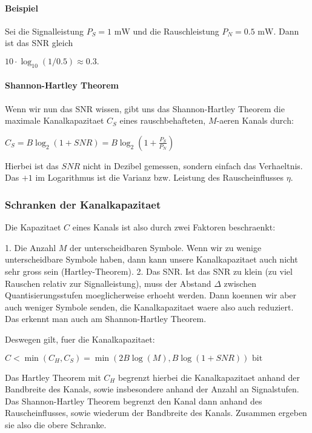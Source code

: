 \paragraph{ Beispiel}

Sei die Signalleistung $P_S = 1 \text{ mW}$ und die Rauschleistung $P_N = 0.5
\text{ mW}$. Dann ist das SNR gleich

$10 \cdot \log_{10}(1/0.5) \approx 0.3 .$

\paragraph{ Shannon-Hartley Theorem}

Wenn wir nun das SNR wissen, gibt uns das Shannon-Hartley Theorem die
maximale Kanalkapazitaet $C_S$ eines rauschbehafteten, $M$-aeren Kanals durch:

$C_S = B \log_2(1 + SNR) = B \log_2(1 + \frac{P_S}{P_N})$

Hierbei ist das $SNR$ nicht in Dezibel gemessen, sondern einfach das
Verhaeltnis. Das $+ 1$ im Logarithmus ist die Varianz bzw. Leistung des
Rauscheinflusses $\eta$.

\subsubsection{ Schranken der Kanalkapazitaet}

Die Kapazitaet $C$ eines Kanals ist also durch zwei Faktoren beschraenkt:

1. Die Anzahl $M$ der unterscheidbaren Symbole. Wenn wir zu wenige
   unterscheidbare Symbole haben, dann kann unsere Kanalkapazitaet auch nicht
   sehr gross sein (Hartley-Theorem).
2. Das SNR. Ist das SNR zu klein (zu viel Rauschen relativ zur Signalleistung),
   muss der Abstand $\Delta$ zwischen Quantisierungsstufen moeglicherweise
   erhoeht werden. Dann koennen wir aber auch weniger Symbole senden, die
   Kanalkapazitaet waere also auch reduziert. Das erkennt man auch am
   Shannon-Hartley Theorem.

Deswegen gilt, fuer die Kanalkapazitaet:

$C < \min(C_H, C_S) = \min(2B\log(M), B\log(1 + SNR)) \text{ bit}$

Das Hartley Theorem mit $C_H$ begrenzt hierbei die Kanalkapazitaet anhand der
Bandbreite des Kanals, sowie insbesondere anhand der Anzahl an Signalstufen. Das
Shannon-Hartley Theorem begrenzt den Kanal dann anhand des Rauscheinflusses,
sowie wiederum der Bandbreite des Kanals. Zusammen ergeben sie also die obere
Schranke.

